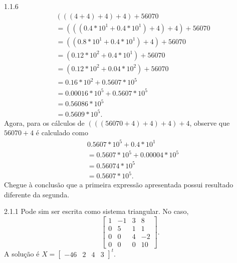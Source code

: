 \begin{Solucao}{1.1.6}
		\begin{align*}
		&(((4+4)+4)+4)+56070\\
		&=(((0.4*10^1+0.4*10^1)+4)+4)+56070\\
		&=((0.8*10^1+0.4*10^1)+4)+56070\\
		&=(0.12*10^2+0.4*10^1)+56070\\
		&=(0.12*10^2+0.04*10^2)+56070\\
		&=0.16*10^2+0.5607*10^5\\
		&=0.00016*10^5+0.5607*10^5\\
		&=0.56086*10^5\\
		&=0.5609*10^5.
		\end{align*}
		Agora, para os cálculos de $(((56070+4)+4)+4)+4$, observe que $56070+4$ é calculado como
		\begin{align*}
		 &0.5607*10^5+0.4*10^1\\
		 &=0.5607*10^5+0.00004*10^5\\
		 &=0.56074*10^5\\
		 &=0.5607*10^5.
		\end{align*}Chegue à conclusão que a primeira expressão apresentada possui resultado diferente da segunda.
	
\end{Solucao}
\begin{Solucao}{2.1.1}
Pode sim ser escrita como sistema triangular. No caso,
$$\begin{bmatrix}
1&-1&3&8\\
0&5&1&1\\
0&0&4&-2\\
0&0&0&10
\end{bmatrix}.$$
A solução é $X=\begin{bmatrix}
-46&2&4&3\end{bmatrix}^t$.
\end{Solucao}
